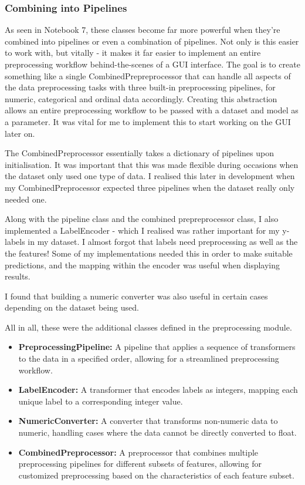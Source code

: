\documentclass[letterpaper,10pt]{article}
\begin{document}
\subsubsection{Combining into Pipelines}
As seen in Notebook 7, these classes become far more powerful when they're combined into pipelines or even a combination of pipelines. Not only is this easier to work with, but vitally - it makes it far easier to implement an entire preprocessing workflow behind-the-scenes of a GUI interface. The goal is to create something like a single CombinedPrepreprocessor that can handle all aspects of the data preprocessing tasks with three built-in preprocessing pipelines, for numeric, categorical and ordinal data accordingly. Creating this abstraction allows an entire preprocessing workflow to be passed with a dataset and model as a parameter. It was vital for me to implement this to start working on the GUI later on. \par
The CombinedPreprocessor essentially takes a dictionary of pipelines upon initialisation. It was important that this was made flexible during occasions when the dataset only used one type of data. I realised this later in development when my CombinedPreprocessor expected three pipelines when the dataset really only needed one. \par
Along with the pipeline class and the combined prepreprocessor class, I also implemented a LabelEncoder - which I realised was rather important for my y-labels in my dataset. I almost forgot that labels need preprocessing as well as the the features! Some of my implementations needed this in order to make suitable predictions, and the mapping within the encoder was useful when displaying results. \par
I found that building a numeric converter was also useful in certain cases depending on the dataset being used. \par
All in all, these were the additional classes defined in the preprocessing module. \par
\begin{itemize}


\item \textbf{PreprocessingPipeline:} A pipeline that applies a sequence of transformers to the data in a specified order, allowing for a streamlined preprocessing workflow.

\item \textbf{LabelEncoder:} A transformer that encodes labels as integers, mapping each unique label to a corresponding integer value.

\item \textbf{NumericConverter:} A converter that transforms non-numeric data to numeric, handling cases where the data cannot be directly converted to float.

\item \textbf{CombinedPreprocessor:} A preprocessor that combines multiple preprocessing pipelines for different subsets of features, allowing for customized preprocessing based on the characteristics of each feature subset.

\end{itemize}
\end{document}
